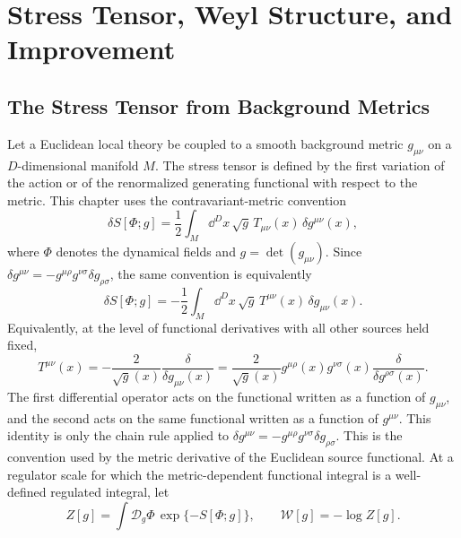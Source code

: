 \chapter{Stress Tensor, Weyl Structure, and Improvement}
\label{ch:volume-iii-stress-tensor-weyl}
\ConventionsEuclideanCFT


\section{The Stress Tensor from Background Metrics}

\begin{definition}
\label{def:metric-source-stress-tensor}
Let a Euclidean local theory be coupled to a smooth background metric
\(g_{\mu\nu}\) on a \(D\)-dimensional manifold \(M\).  The stress tensor is
defined by the first variation of the action or of the renormalized generating
functional with respect to the metric.  This chapter uses the
contravariant-metric convention
\begin{equation}
  \delta S[\Phi;g]
  =
  \frac12
  \int_M \dd^D x\,\sqrt g\,
  T_{\mu\nu}(x)\,\delta g^{\mu\nu}(x),
  \label{eq:stress-tensor-metric-variation}
\end{equation}
where \(\Phi\) denotes the dynamical fields and
\(g=\det(g_{\mu\nu})\).  Since
\(\delta g^{\mu\nu}=-g^{\mu\rho}g^{\nu\sigma}\delta g_{\rho\sigma}\), the same
convention is equivalently
\[
  \delta S[\Phi;g]
  =
  -\frac12
  \int_M \dd^D x\,\sqrt g\,
  T^{\mu\nu}(x)\,\delta g_{\mu\nu}(x).
\]
Equivalently, at the level of functional derivatives with all other sources
held fixed,
\begin{equation}
  T^{\mu\nu}(x)
  =
  -\frac{2}{\sqrt g(x)}
  \frac{\delta}{\delta g_{\mu\nu}(x)}
  =
  \frac{2}{\sqrt g(x)}
  g^{\mu\rho}(x)g^{\nu\sigma}(x)
  \frac{\delta}{\delta g^{\rho\sigma}(x)} .
  \label{eq:stress-tensor-covariant-contravariant-derivatives}
\end{equation}
The first differential operator acts on the functional written as a function of
\(g_{\mu\nu}\), and the second acts on the same functional written as a function
of \(g^{\mu\nu}\).  This identity is only the chain rule applied to
\(\delta g^{\mu\nu}=-g^{\mu\rho}g^{\nu\sigma}\delta g_{\rho\sigma}\).
This is the convention used by the metric derivative of the Euclidean
source functional.  At a regulator scale for which the metric-dependent
functional integral is a well-defined regulated integral, let
\[
  Z[g]=\int \mathcal D_g\Phi\,\exp\{-S[\Phi;g]\},
  \qquad
  \mathcal W[g]=-\log Z[g].
\]
\end{definition}
